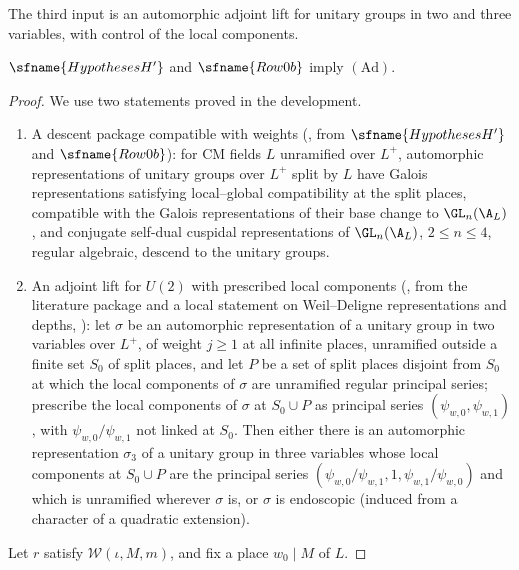 The third input is an automorphic adjoint lift for unitary groups in two and three variables, with control of the local components.

\begin{proposition}\label{pf:eis:propAd}
$\sfname{HypothesesH'}$ and $\sfname{Row0b}$ imply $(\mathrm{Ad})$.
\end{proposition}

\begin{proof}
We use two statements proved in the development.
\begin{enumerate}[label=(\alph*)]
\item A descent package compatible with weights (, from
  $\sfname{HypothesesH'}$ and $\sfname{Row0b}$): for CM fields $L$ unramified over $L^+$, automorphic representations of unitary groups
  over $L^+$ split by $L$ have Galois representations satisfying local--global compatibility at the split places, compatible with the
  Galois representations of their base change to $\GL_n(\A_L)$, and conjugate self-dual cuspidal representations of $\GL_n(\A_L)$,
  $2\le n\le4$, regular algebraic, descend to the unitary groups.
\item An adjoint lift for $U(2)$ with prescribed local components
  (, from the literature package and a local
  statement on Weil--Deligne representations and depths, ): let $\sigma$ be an automorphic
  representation of a unitary group in two variables over $L^+$, of weight $j\ge1$ at all infinite places, unramified outside a finite
  set $S_0$ of split places, and let $P$ be a set of split places disjoint from $S_0$ at which the local components of $\sigma$ are
  unramified regular principal series; prescribe the local components of $\sigma$ at $S_0\cup P$ as principal series $(\psi_{w,0},\psi_{w,1})$, with
  $\psi_{w,0}/\psi_{w,1}$ not linked at $S_0$. Then either there is an automorphic representation $\sigma_3$ of a unitary group in three variables
  whose local components at $S_0\cup P$ are the principal series $(\psi_{w,0}/\psi_{w,1},1,\psi_{w,1}/\psi_{w,0})$ and which is unramified wherever
  $\sigma$ is, or $\sigma$ is endoscopic (induced from a character of a quadratic extension).
\end{enumerate}
Let $r$ satisfy $\mathcal W(\iota,M,m)$, and fix a place $w_0\mid M$ of $L$.


\end{proof}
